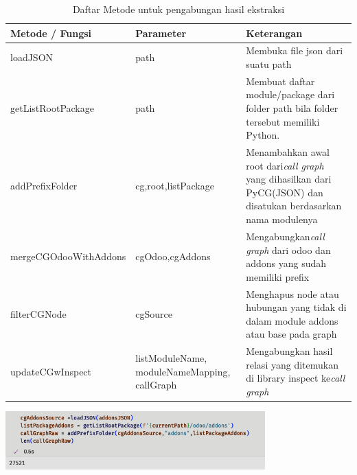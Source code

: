 \begingroup
\setlength{\LTleft}{-20cm plus -1fill}
\setlength{\LTright}{\LTleft}
\begin{small}
	\begin{longtable}{|p{4cm}|p{3cm}|p{6cm}|}
		\caption{Daftar Metode untuk pengabungan hasil ekstraksi}\\
		\hline
		\textbf{Metode / Fungsi} & \textbf{Parameter} & \textbf{Keterangan}\\
		\endfirsthead
		
		\hline  

		loadJSON
		& path
		 & Membuka file json dari suatu path  \\

		 \hline  

		 getListRootPackage
		& path
		 & Membuat daftar module/package dari folder path bila folder tersebut memiliki Python. \\

		 \hline  

		 addPrefixFolder
		& cg,root,listPackage
		 & Menambahkan awal root dari\textit{call graph} yang dihasilkan dari PyCG(JSON) dan disatukan berdasarkan nama modulenya  \\
		 
		 \hline  

		 mergeCGOdooWithAddons
		& cgOdoo,cgAddons
		 & Mengabungkan\textit{call graph} dari odoo dan addons yang sudah memiliki prefix  \\


		 \hline  

		 filterCGNode
		& cgSource
		 & Menghapus node atau hubungan yang tidak di dalam module addons atau base pada graph \\

		 \hline
		
		 updateCGwInspect
		& listModuleName, moduleNameMapping, callGraph
		 & Mengabungkan hasil relasi yang ditemukan di library inspect ke\textit{call graph}  \\

		 \hline
	\end{longtable}
\end{small}
\endgroup

\begin{center}
	\includegraphics[width=10cm]{img/bab_4/ekstraksi_1.png}
	\label{fig:ekstraksi_1}
\end{center}

